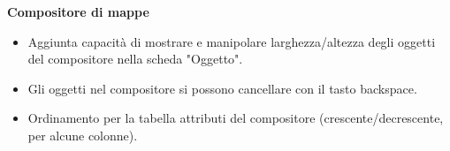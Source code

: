 \textbf{Compositore di mappe}

\begin{itemize}[label=--]
\item Aggiunta capacità di mostrare e manipolare larghezza/altezza degli oggetti del compositore
nella scheda "Oggetto". 
\item Gli oggetti nel compositore si possono cancellare con il tasto backspace. 
\item Ordinamento per la tabella attributi del compositore (crescente/decrescente, per alcune colonne).
\end{itemize}

